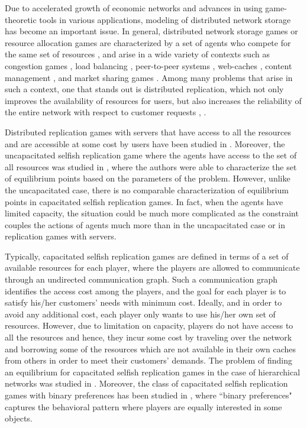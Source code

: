 \documentclass[conference, 10pt, twocolumn]{ieeeconf}
\begin{document}
Due to accelerated growth of economic networks and advances in using game-theoretic tools in various applications, modeling of distributed network storage has become an important issue. In general, distributed network storage games or resource allocation games are characterized by a set of agents who compete for the same set of resources \cite{pacifici2012convergence,masucci2014strategic}, and arise in a wide variety of contexts such as congestion games \cite{milchtaich1996congestion,ackermann2008impact,fabrikant2004complexity}, load balancing \cite{ghosh1994dynamic}, peer-to-peer systems \cite{pollatos2008social}, web-caches \cite{gopalakrishnan2012cache}, content management \cite{pollatos2008social}, and market sharing games \cite{goemans2006market}. Among many problems that arise in such a context, one that stands out is distributed replication, which not only improves the availability of resources for users, but also increases the reliability of the entire network with respect to customer requests \cite{chun2004selfish}, \cite{goyal2000learning}.           

Distributed replication games with servers that have access to all the resources and are accessible at some cost by users have been studied in \cite{laoutaris2006distributed}. Moreover, the uncapacitated selfish replication game where the agents have access to the set of all resources was studied in \cite{chun2004selfish}, where the authors were able to characterize the set of equilibrium points based on the parameters of the problem. However, unlike the uncapacitated case, there is no comparable characterization of equilibrium points in capacitated selfish replication games. In fact, when the agents have limited capacity, the situation could be much more complicated as the constraint couples the actions of agents much more than in the uncapacitated case or in replication games with servers. 

Typically, capacitated selfish replication games are defined in terms of a set of available resources for each player, where the players are allowed to communicate through an undirected communication graph. Such a communication graph identifies the access cost among the players, and the goal for each player is to satisfy his/her customers' needs with minimum cost. Ideally, and in order to avoid any additional cost, each player only wants to use his/her own set of resources. However, due to limitation on capacity, players do not have access to all the resources and hence, they incur some cost by traveling over the network and borrowing some of the resources which are not available in their own caches from others in order to meet their customers' demands. The problem of finding an equilibrium for capacitated selfish replication games in the case of hierarchical networks was studied in \cite{gopalakrishnan2012cache}. Moreover, the class of capacitated selfish replication games with binary preferences has been studied in \cite{gopalakrishnan2012cache,etesami2014pure}, where ``binary preferences" captures the behavioral pattern where players are
equally interested in some objects. 
\end{document}
